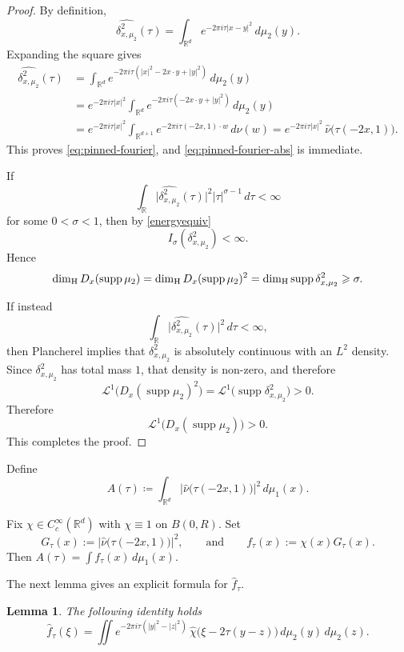 \documentclass[11pt]{amsart}
\numberwithin{equation}{section}
\renewcommand{\ge}{\geqslant}
\newcommand{\hd}{\dim_{\textup{H}}}
\newtheorem{lemma}[theorem]{Lemma}
\theoremstyle{plain}
\theoremstyle{remark}
\newcommand{\R}{\mathbb{R}}
\newcommand{\Rd}{\mathbb{R}^d}
\newcommand{\Rdpo}{\mathbb{R}^{d+1}}
\newcommand{\supp}{\operatorname{supp}}
\newcommand{\cL}{\mathcal{L}}
\begin{document}
\begin{proof}
By definition,
\[
\widehat{\delta_{x,\mu_2}^2}(\tau)
=
\int_{\Rd}e^{-2\pi i\tau|x-y|^2}\,d\mu_2(y).
\]
Expanding the square gives
\begin{align*}
\widehat{\delta_{x,\mu_2}^2}(\tau)
&=
\int_{\Rd}e^{-2\pi i\tau(|x|^2-2x\cdot y+|y|^2)}\,d\mu_2(y) \\
&=
 e^{-2\pi i\tau|x|^2}
\int_{\Rd}e^{-2\pi i\tau(-2x\cdot y+|y|^2)}\,d\mu_2(y) \\
&=
 e^{-2\pi i\tau|x|^2}
\int_{\Rdpo}e^{-2\pi i\tau(-2x,1)\cdot w}\,d\nu(w)
=
 e^{-2\pi i\tau|x|^2}\,\widehat\nu\bigl(\tau(-2x,1)\bigr).
\end{align*}
This proves \eqref{eq:pinned-fourier}, and \eqref{eq:pinned-fourier-abs} is immediate.

If
\[
\int_{\R}\bigl|\widehat{\delta_{x,\mu_2}^2}(\tau)\bigr|^2|\tau|^{\sigma-1}\,d\tau<\infty
\]
for some $0<\sigma<1$, then by \eqref{energyequiv}
\[
I_{\sigma}(\delta_{x,\mu_2}^2)<\infty.
\]
Hence
\[
\hd D_x(\supp\mu_2)
=
\hd D_x(\supp\mu_2)^2
=
\hd\supp\delta_{x,\mu_2}^2
\ge \sigma.
\]

If instead
\[
\int_{\R}\bigl|\widehat{\delta_{x,\mu_2}^2}(\tau)\bigr|^2\,d\tau<\infty,
\]
then Plancherel implies that $\delta_{x,\mu_2}^2$ is absolutely continuous with an $L^2$ density. Since $\delta_{x,\mu_2}^2$ has total mass $1$, that density is non-zero, and therefore
\[
\cL^1\bigl(D_x(\supp\mu_2)^2\bigr)=\cL^1\bigl(\supp\delta_{x,\mu_2}^2\bigr)>0.
\]
Therefore
\[
\cL^1\bigl(D_x(\supp\mu_2)\bigr)>0.
\] 
This completes the proof.
\end{proof}


Define
\begin{equation}
\label{eq:A-def}
A(\tau)\coloneqq \int_{\Rd} \bigl|\widehat\nu\bigl(\tau(-2x,1)\bigr)\bigr|^2\,d\mu_1(x).
\end{equation}


Fix $\chi\in C_c^\infty(\Rd)$ with $\chi\equiv 1$ on $B(0,R)$.
Set
\[
G_{\tau}(x):=\bigl|\widehat\nu\bigl(\tau(-2x,1)\bigr)\bigr|^2,
\qquad \text{and} \qquad 
f_{\tau}(x):=\chi(x)G_{\tau}(x).
\]
Then $A(\tau)=\int f_{\tau}(x)\,d\mu_1(x)$.

The next lemma gives an explicit formula for \(\widehat f_\tau\).

\begin{lemma}
The following identity holds
\begin{equation}\label{eq:fhat-theta1-theta2}
\widehat f_{\tau}(\xi)
=
\iint e^{-2\pi i\tau(|y|^2-|z|^2)}\,\widehat\chi\bigl(\xi-2\tau(y-z)\bigr)
\,d\mu_2(y)\,d\mu_2(z).
\end{equation}
\end{lemma}
\end{document}
